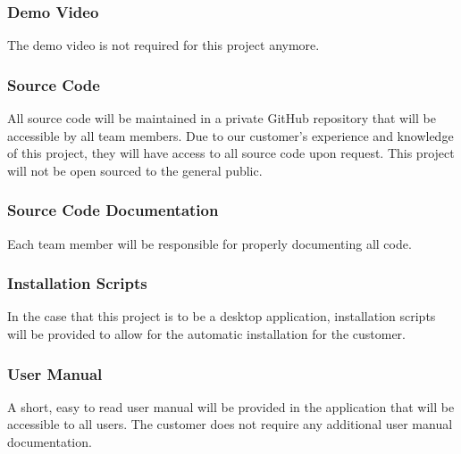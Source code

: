 \subsubsection{Demo Video}
The demo video is not required for this project anymore.

\subsubsection{Source Code}
All source code will be maintained in a private GitHub repository that will be accessible by all team members. Due to our customer's experience and knowledge of this project, they will have access to all source code upon request. This project will not be open sourced to the general public.

\subsubsection{Source Code Documentation}
Each team member will be responsible for properly documenting all code.

\subsubsection{Installation Scripts}
 In the case that this project is to be a desktop application, installation scripts will be provided to allow for the automatic installation for the customer.

\subsubsection{User Manual}
A short, easy to read user manual will be provided in the application that will be accessible to all users. The customer does not require any additional user manual documentation.
